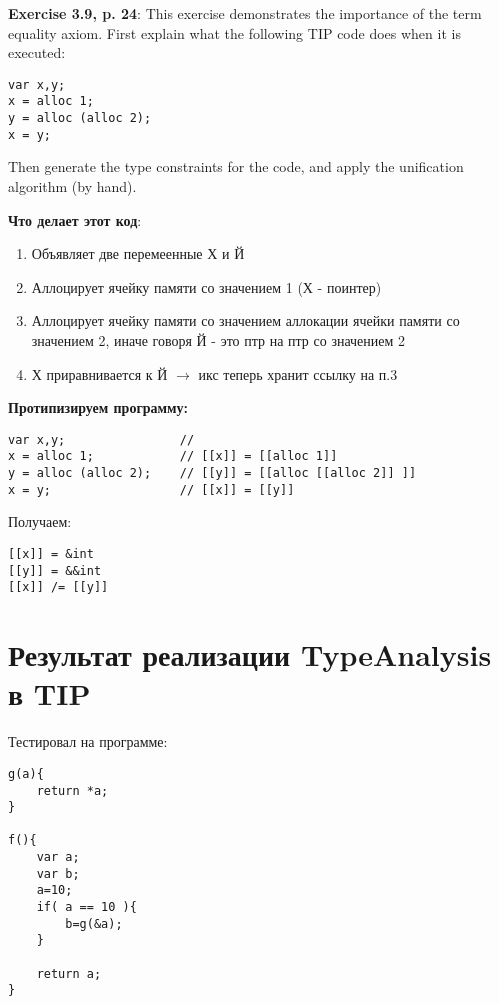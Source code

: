 \documentclass{report}
\begin{document}
\begin{mdframed}
\textbf{Exercise 3.9, p. 24}: This exercise demonstrates the importance of the term equality
axiom. First explain what the following TIP code does when it is executed:

\begin{center}
\begin{lstlisting}
var x,y;
x = alloc 1;
y = alloc (alloc 2);
x = y;
\end{lstlisting}
\end{center}

Then generate the type constraints for the code, and apply the unification
algorithm (by hand).

\end{mdframed}

\textbf{Что делает этот код}:
\begin{enumerate}
    \item Объявляет две перемеенные Х и Й
    \item Аллоцирует ячейку памяти со значением 1 (Х - поинтер)
    \item Аллоцирует ячейку памяти со значением аллокации ячейки памяти со значением 2, иначе говоря Й - это птр на птр со значением 2
    \item Х приравнивается к Й \( \rightarrow\) икс теперь хранит ссылку на п.3
\end{enumerate}

\textbf{Протипизируем программу:}
\begin{center}
\begin{lstlisting}
var x,y;                //
x = alloc 1;            // [[x]] = [[alloc 1]]
y = alloc (alloc 2);    // [[y]] = [[alloc [[alloc 2]] ]]
x = y;                  // [[x]] = [[y]]
\end{lstlisting}
\end{center}

Получаем:
\begin{center}
\begin{lstlisting}
[[x]] = &int
[[y]] = &&int
[[x]] /= [[y]]
\end{lstlisting}
\end{center}

\section{Результат реализации TypeAnalysis в TIP}

Тестировал на программе:
\begin{lstlisting}
g(a){
    return *a;
}

f(){
    var a;
    var b;
    a=10;
    if( a == 10 ){
        b=g(&a);
    }

    return a;
}
\end{lstlisting}
\end{document}
